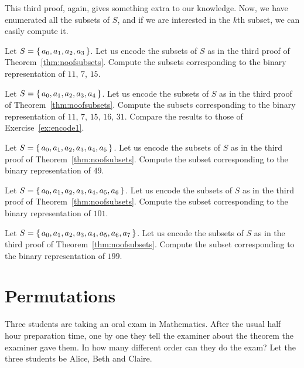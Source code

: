 This third proof, again, gives something extra to our knowledge. 
Now, we have enumerated all the subsets of $S$, 
and if we are interested in the $k$th subset, 
we can easily compute it. 

\begin{exercise}\label{ex:encode1}
Let $S = \left\{\,a_0, a_1, a_2, a_3\,\right\}$. 
Let us encode the subsets of $S$ as in the third proof of Theorem~\ref{thm:noofsubsets}. 
Compute the subsets corresponding to the binary representation of $11$, $7$, $15$. 
\end{exercise}

\begin{exercise}\label{ex:encode2}
Let $S = \left\{\,a_0, a_1, a_2, a_3, a_4\,\right\}$. 
Let us encode the subsets of $S$ as in the third proof of Theorem~\ref{thm:noofsubsets}. 
Compute the subsets corresponding to the binary representation of $11$, $7$, $15$, $16$, $31$. 
Compare the results to those of Exercise~\ref{ex:encode1}. 
\end{exercise}

\begin{exercise}\label{ex:encode3}
Let $S = \left\{\,a_0, a_1, a_2, a_3, a_4, a_5\,\right\}$. 
Let us encode the subsets of $S$ as in the third proof of Theorem~\ref{thm:noofsubsets}. 
Compute the subset corresponding to the binary representation of $49$. 
\end{exercise}

\begin{exercise}\label{ex:encode4}
Let $S = \left\{\,a_0, a_1, a_2, a_3, a_4, a_5, a_6\,\right\}$. 
Let us encode the subsets of $S$ as in the third proof of Theorem~\ref{thm:noofsubsets}. 
Compute the subset corresponding to the binary representation of $101$. 
\end{exercise}

\begin{exercise}\label{ex:encode5}
Let $S = \left\{\,a_0, a_1, a_2, a_3, a_4, a_5, a_6, a_7\,\right\}$. 
Let us encode the subsets of $S$ as in the third proof of Theorem~\ref{thm:noofsubsets}. 
Compute the subset corresponding to the binary representation of $199$. 
\end{exercise}






\section{Permutations}\label{sec:permutations}

Three students are taking an oral exam in Mathematics. 
After the usual half hour preparation time, 
one by one they tell the examiner about the theorem the examiner gave them. 
In how many different order can they do the exam? 
Let the three students be Alice, Beth and Claire. 

